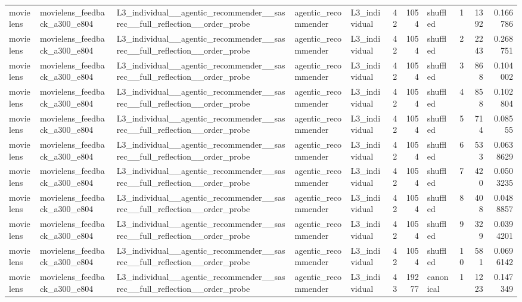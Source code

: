 \begin{table}[htbp!]
\begin{tabular}{lllllrrlrrr}
movielens & movielens\_feedback\_a300\_e804 & L3\_individual\_\_agentic\_recommender\_\_sasrec\_\_full\_reflection\_\_order\_probe & agentic\_recommender & L3\_individual & 42 & 1054 & shuffled & 1 & 1392 & 0.166786 \\
movielens & movielens\_feedback\_a300\_e804 & L3\_individual\_\_agentic\_recommender\_\_sasrec\_\_full\_reflection\_\_order\_probe & agentic\_recommender & L3\_individual & 42 & 1054 & shuffled & 2 & 2243 & 0.268751 \\
movielens & movielens\_feedback\_a300\_e804 & L3\_individual\_\_agentic\_recommender\_\_sasrec\_\_full\_reflection\_\_order\_probe & agentic\_recommender & L3\_individual & 42 & 1054 & shuffled & 3 & 868 & 0.104002 \\
movielens & movielens\_feedback\_a300\_e804 & L3\_individual\_\_agentic\_recommender\_\_sasrec\_\_full\_reflection\_\_order\_probe & agentic\_recommender & L3\_individual & 42 & 1054 & shuffled & 4 & 858 & 0.102804 \\
movielens & movielens\_feedback\_a300\_e804 & L3\_individual\_\_agentic\_recommender\_\_sasrec\_\_full\_reflection\_\_order\_probe & agentic\_recommender & L3\_individual & 42 & 1054 & shuffled & 5 & 714 & 0.08555 \\
movielens & movielens\_feedback\_a300\_e804 & L3\_individual\_\_agentic\_recommender\_\_sasrec\_\_full\_reflection\_\_order\_probe & agentic\_recommender & L3\_individual & 42 & 1054 & shuffled & 6 & 533 & 0.0638629 \\
movielens & movielens\_feedback\_a300\_e804 & L3\_individual\_\_agentic\_recommender\_\_sasrec\_\_full\_reflection\_\_order\_probe & agentic\_recommender & L3\_individual & 42 & 1054 & shuffled & 7 & 420 & 0.0503235 \\
movielens & movielens\_feedback\_a300\_e804 & L3\_individual\_\_agentic\_recommender\_\_sasrec\_\_full\_reflection\_\_order\_probe & agentic\_recommender & L3\_individual & 42 & 1054 & shuffled & 8 & 408 & 0.0488857 \\
movielens & movielens\_feedback\_a300\_e804 & L3\_individual\_\_agentic\_recommender\_\_sasrec\_\_full\_reflection\_\_order\_probe & agentic\_recommender & L3\_individual & 42 & 1054 & shuffled & 9 & 329 & 0.0394201 \\
movielens & movielens\_feedback\_a300\_e804 & L3\_individual\_\_agentic\_recommender\_\_sasrec\_\_full\_reflection\_\_order\_probe & agentic\_recommender & L3\_individual & 42 & 1054 & shuffled & 10 & 581 & 0.0696142 \\
movielens & movielens\_feedback\_a300\_e804 & L3\_individual\_\_agentic\_recommender\_\_sasrec\_\_full\_reflection\_\_order\_probe & agentic\_recommender & L3\_individual & 43 & 19277 & canonical & 1 & 1223 & 0.147349 \\

\end{tabular}
\end{table}
